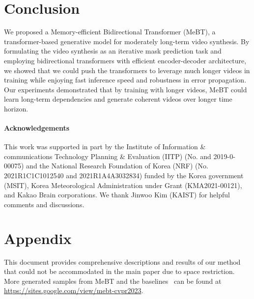 \documentclass[10pt,twocolumn,letterpaper]{article}
\newcommand{\cutparagraphup}{\vspace*{-0.1in}}
\begin{document}
\fi \cutparagraphup
\section{Conclusion}
We proposed a Memory-efficient Bidirectional Transformer (MeBT), a transformer-based generative model for moderately long-term video synthesis.
By formulating the video synthesis as an iterative mask prediction task and employing bidirectional transformers with efficient encoder-decoder architecture, we showed that we could push the transformers to leverage much longer videos in training while enjoying fast inference speed and robustness in error propagation.
Our experiments demonstrated that by training with longer videos, MeBT could learn long-term dependencies and generate coherent videos over longer time horizon.
 
\cutparagraphup
\paragraph{Acknowledgements}
This work was supported in part by the Institute of Information \& communications Technology Planning \& Evaluation (IITP) (No.  and 2019-0-00075) and the National Research Foundation of Korea (NRF) (No. 2021R1C1C1012540 and 2021R1A4A3032834) funded by the Korea government (MSIT), Korea Meteorological Administration under Grant (KMA2021-00121), and Kakao Brain corporations. 
We thank Jinwoo Kim (KAIST) for helpful comments and discussions.

{\small


}
\clearpage






















\appendix

\section*{Appendix}
This document provides comprehensive descriptions and results of our method that could not be accommodated in the main paper due to space restriction. More generated samples from MeBT and the baselines~\cite{MoCoGAN-HD, DIGAN, TATS, CCVS} can be found at \href{https://sites.google.com/view/mebt-cvpr2023}{https://sites.google.com/view/mebt-cvpr2023}.
\end{document}
